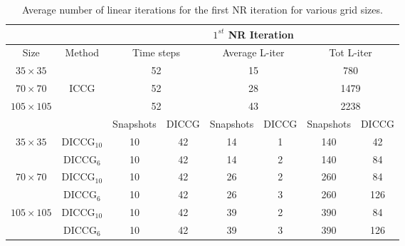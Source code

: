 \documentclass[12pt]{article}
\numberwithin{equation}{section}
\begin{document}
\begin{table}[!h]\centering
\begin{minipage}{1\textwidth}
\vspace{-10pt}
\centering
\begin{tabular}{ |c|c|c|c|c|c|c|c|} 
  \hline
 & & \multicolumn{6}{|c|}{$1^{st}$ NR Iteration}  \\
\hline
Size&Method&  \multicolumn{2}{|c|}{Time steps} &\multicolumn{2}{|c|}{Average L-iter} & \multicolumn{2}{|c|}{Tot L-iter}\\
\hline
$35\times35$& &\multicolumn{2}{|c|}{52} & \multicolumn{2}{|c|}{15}& \multicolumn{2}{|c|}{780} \\

$70\times70$&ICCG&\multicolumn{2}{|c|}{52}& \multicolumn{2}{|c|}{28}& \multicolumn{2}{|c|}{1479}\\

$105\times105$& & \multicolumn{2}{|c|}{52} &\multicolumn{2}{|c|}{43} & \multicolumn{2}{|c|}{2238}\\
\hline
&&Snapshots&DICCG&Snapshots&DICCG&Snapshots&DICCG\\
\hline
$35\times35$&DICCG$_{10}$&10&42&14&1&140&42 \\
&DICCG$_6$&10&42&14&2&140&84 \\
\hline
$70\times70$&DICCG$_{10}$ &10&42 &26&2&260&84 \\
&DICCG$_6$ &10&42&26&3&260&126\\
\hline
$105\times105$&DICCG$_{10}$ &10&42 &39&2&390&84 \\
&DICCG$_6$&10&42&39&3&390&126 \\
\hline
 \end{tabular}
\caption{Average number of linear iterations for the first NR iteration for various grid sizes. }\label{table:liters1}
\end{minipage}
\end{table}
\end{document}
